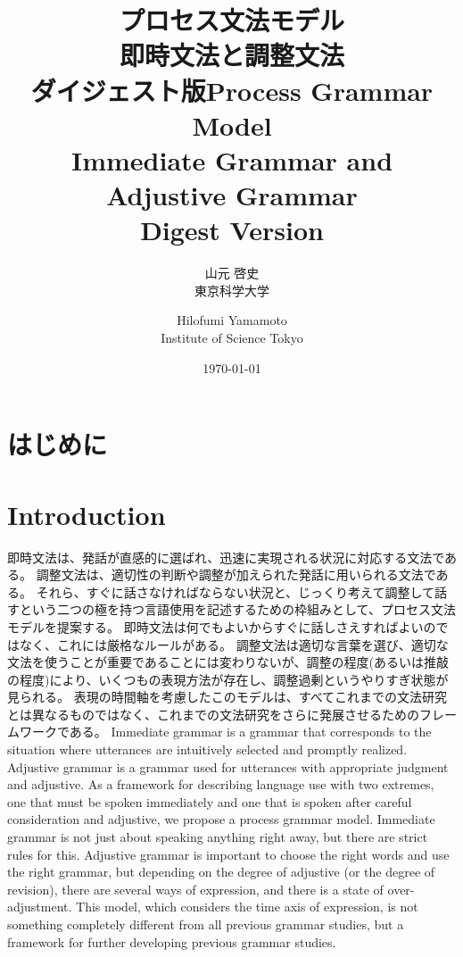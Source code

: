 \documentclass[a4paper,xelatex,ja=standard]{bxjsarticle}
\title{\textbf{プロセス文法モデル\\即時文法と調整文法\\
\normalsize ダイジェスト版}}
\author{
  山元 啓史\\東京科学大学
}
\title{Process Grammar Model\\Immediate Grammar and Adjustive Grammar\\\Large Digest Version}
\author{
Hilofumi Yamamoto\\Institute of Science Tokyo
}
\date{\today}
\begin{document}
\maketitle



\ifJPN
\section{はじめに}
\else
\section{Introduction}
\fi

\ifJPN
即時文法は、発話が直感的に選ばれ、迅速に実現される状況に対応する文法である。
調整文法は、適切性の判断や調整が加えられた発話に用いられる文法である。
それら、すぐに話さなければならない状況と、じっくり考えて調整して話すという二つの極を持つ言語使用を記述するための枠組みとして、プロセス文法モデルを提案する。
即時文法は何でもよいからすぐに話しさえすればよいのではなく、これには厳格なルールがある。
調整文法は適切な言葉を選び、適切な文法を使うことが重要であることには変わりないが、調整の程度(あるいは推敲の程度)により、いくつもの表現方法が存在し、調整過剰というやりすぎ状態が見られる。
表現の時間軸を考慮したこのモデルは、すべてこれまでの文法研究とは異なるものではなく、これまでの文法研究をさらに発展させるためのフレームワークである。
\else
Immediate grammar is a grammar that corresponds to the situation where utterances are intuitively selected and promptly realized.
Adjustive grammar is a grammar used for utterances with appropriate judgment and adjustive.
As a framework for describing language use with two extremes, one that must be spoken immediately and one that is spoken after careful consideration and adjustive, we propose a process grammar model.
Immediate grammar is not just about speaking anything right away, but there are strict rules for this.
Adjustive grammar is important to choose the right words and use the right grammar, but depending on the degree of adjustive (or the degree of revision), there are several ways of expression, and there is a state of over-adjustment.
This model, which considers the time axis of expression, is not something completely different from all previous grammar studies, but a framework for further developing previous grammar studies.
\fi
\end{document}
